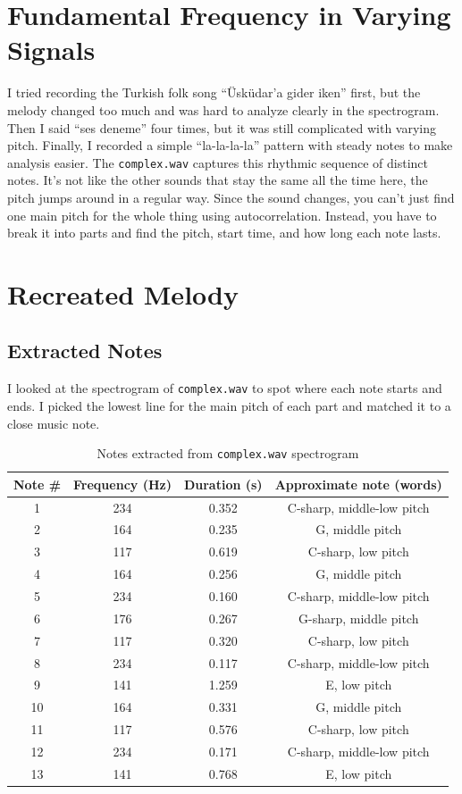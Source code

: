\documentclass[11pt,a4paper]{report}
\begin{document}
\section*{Fundamental Frequency in Varying Signals}


I tried recording the Turkish folk song ``Üsküdar'a gider iken'' first, but the melody changed too much and was hard to analyze clearly in the spectrogram. Then I said ``ses deneme'' four times, but it was still complicated with varying pitch. Finally, I recorded a simple ``la-la-la-la'' pattern with steady notes to make analysis easier. The \texttt{complex.wav} captures this rhythmic sequence of distinct notes. It's not like the other sounds that stay the same all the time here, the pitch jumps around in a regular way. Since the sound changes, you can't just find one main pitch for the whole thing using autocorrelation. Instead, you have to break it into parts and find the pitch, start time, and how long each note lasts.


\section*{Recreated Melody}

\subsection*{Extracted Notes}

I looked at the spectrogram of \texttt{complex.wav} to spot where each note starts and ends. I picked the lowest line for the main pitch of each part and matched it to a close music note.

\begin{table}[H]
  \centering
  \caption{Notes extracted from \texttt{complex.wav} spectrogram}
  \begin{tabular}{cccc}
    \toprule
    Note \# & Frequency (Hz) & Duration (s) & Approximate note (words) \\
    \midrule
    1  & 234 & 0.352 & C-sharp, middle-low pitch \\
    2  & 164 & 0.235 & G, middle pitch \\
    3  & 117 & 0.619 & C-sharp, low pitch \\
    4  & 164 & 0.256 & G, middle pitch \\
    5  & 234 & 0.160 & C-sharp, middle-low pitch \\
    6  & 176 & 0.267 & G-sharp, middle pitch \\
    7  & 117 & 0.320 & C-sharp, low pitch \\
    8  & 234 & 0.117 & C-sharp, middle-low pitch \\
    9  & 141 & 1.259 & E, low pitch \\
    10 & 164 & 0.331 & G, middle pitch \\
    11 & 117 & 0.576 & C-sharp, low pitch \\
    12 & 234 & 0.171 & C-sharp, middle-low pitch \\
    13 & 141 & 0.768 & E, low pitch \\
    \bottomrule
  \end{tabular}
\end{table}
\end{document}
